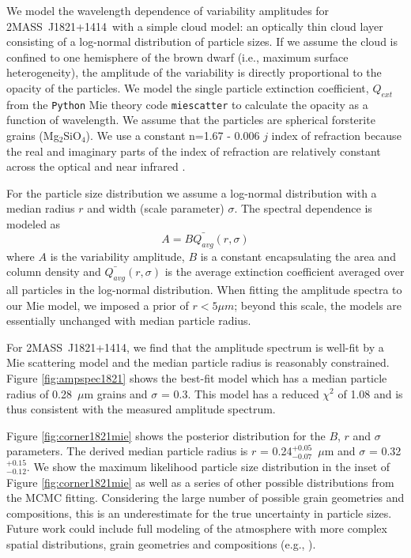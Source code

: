 \documentclass[twocolumn]{aastex6}
\newcommand{\sha}{2MASS~J0835$-$0819}
\newcommand{\shb}{2MASS~J1821+1414}
\begin{document}
We model the wavelength dependence of variability amplitudes for \shb\ with a simple cloud model: an optically thin cloud layer consisting of a log-normal distribution of particle sizes.
If we assume the cloud is confined to one hemisphere of the brown dwarf (i.e., maximum surface heterogeneity), the amplitude of the variability is directly proportional to the opacity of the particles.
We model the single particle extinction coefficient, $Q_{ext}$ from the \texttt{Python} Mie theory code \texttt{miescatter} \citep{bohren1983mie} to calculate the opacity as a function of wavelength.
We assume that the particles are spherical forsterite grains (Mg$_2$SiO$_4$).
We use a constant n=1.67 - 0.006 $j$ index of refraction because the real and imaginary parts of the index of refraction are relatively constant across the optical and near infrared \citep{scott1996forsterite}.


For the particle size distribution we assume a log-normal distribution with a median radius $r$ and width (scale parameter) $\sigma$.
The spectral dependence is modeled as 
\begin{equation}
A = B \bar{Q_{avg}}(r,\sigma)
\end{equation}
where $A$ is the variability amplitude, $B$ is a constant encapsulating the area and column density and $\bar{Q_{avg}}(r,\sigma)$ is the average extinction coefficient averaged over all particles in the log-normal distribution.
When fitting the amplitude spectra to our Mie model, we imposed a prior of $r < 5 \mu m$; beyond this scale, the models are essentially unchanged with median particle radius.

For \shb, we find that the amplitude spectrum is well-fit by a Mie scattering model and the median particle radius is reasonably constrained.
Figure \ref{fig:ampspec1821} shows the best-fit model which has a median particle radius of 0.28~$\mu$m grains and $\sigma$ = 0.3.
This model has a reduced $\chi^2$ of 1.08 and is thus consistent with the measured amplitude spectrum.

Figure \ref{fig:corner1821mie} shows the posterior distribution for the $B$, $r$ and $\sigma$ parameters.
The derived median particle radius is $r$ = 0.24$^{+0.05}_{-0.07}$~$\mu$m 
and $\sigma$ = 0.32$^{+0.15}_{-0.12}$.
We show the maximum likelihood particle size distribution in the inset of Figure \ref{fig:corner1821mie} as well as a series of other possible distributions from the MCMC fitting.
Considering the large number of possible grain geometries and compositions, this is an underestimate for the true uncertainty in particle sizes.
Future work could include full modeling of the atmosphere with more complex spatial distributions, grain geometries and compositions (e.g., \citealt{2008ApJ...675L.105H}).
\end{document}
